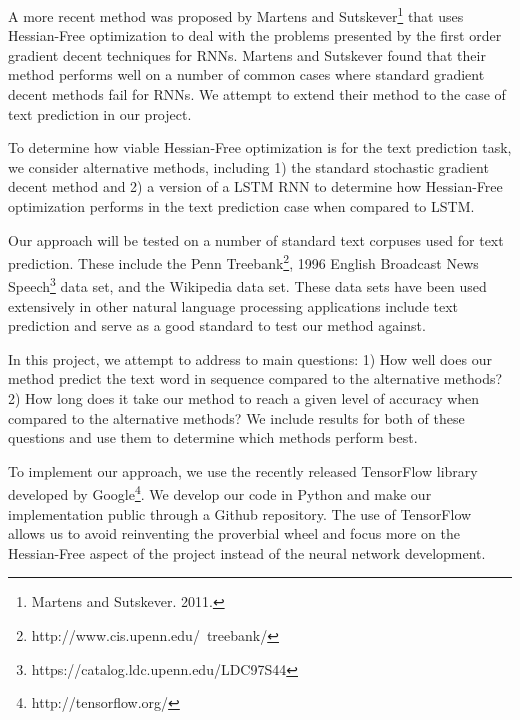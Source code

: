 \documentclass{article}
\begin{document}
A more recent method was proposed by Martens and Sutskever\footnote{Martens and Sutskever. 2011.} that uses Hessian-Free optimization to deal with the problems presented by the first order gradient decent techniques for RNNs.  Martens and Sutskever found that their method performs well on a number of common cases where standard gradient decent methods fail for RNNs.  We attempt to extend their method to the case of text prediction in our project.

To determine how viable Hessian-Free optimization is for the text prediction task, we consider alternative methods, including 1) the standard stochastic gradient decent method and 2) a version of a LSTM RNN to determine how Hessian-Free optimization performs in the text prediction case when compared to LSTM.

Our approach will be tested on a number of standard text corpuses used for text prediction.  These include the Penn Treebank\footnote{http://www.cis.upenn.edu/~treebank/}, 1996 English Broadcast News Speech\footnote{https://catalog.ldc.upenn.edu/LDC97S44} data set, and the Wikipedia data set.  These data sets have been used extensively in other natural language processing applications include text prediction and serve as a good standard to test our method against.

In this project, we attempt to address to main questions: 1) How well does our method predict the text word in sequence compared to the alternative methods? 2) How long does it take our method to reach a given level of accuracy when compared to the alternative methods?  We include results for both of these questions and use them to determine which methods perform best.

To implement our approach, we use the recently released TensorFlow library developed by Google\footnote{http://tensorflow.org/}.  We develop our code in Python and make our implementation public through a Github repository. The use of TensorFlow allows us to avoid reinventing the proverbial wheel and focus more on the Hessian-Free aspect of the project instead of the neural network development.
\end{document}
